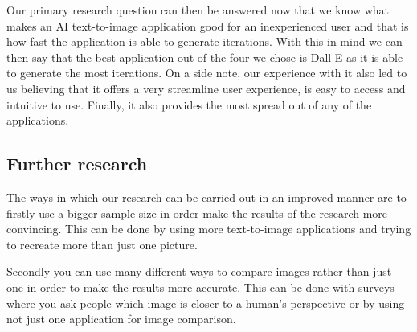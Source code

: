 \documentclass[]{report}
\begin{document}
	Our primary research question can then be answered now that we know what makes an AI text-to-image application good for an inexperienced user and that is how fast the application is able to generate iterations. With this in mind we can then say that the best application out of the four we chose is Dall-E as it is able to generate the most iterations. On a side note, our experience with it also led to us believing that it offers a very streamline user experience, is easy to access and intuitive to use. Finally, it also provides the most spread out of any of the applications.
	
	\subsection{Further research}
	
	The ways in which our research can be carried out in an improved manner are to firstly use a bigger sample size in order make the results of the research more convincing. This can be done by using more text-to-image applications and trying to recreate more than just one picture. 
	
	Secondly you can use many different ways to compare images rather than just one in order to make the results more accurate. This can be done with surveys where you ask people which image is closer to a human’s perspective or by using not just one application for image comparison.
	
	\newpage
	\printbibliography[title=References]
	
\end{document}
